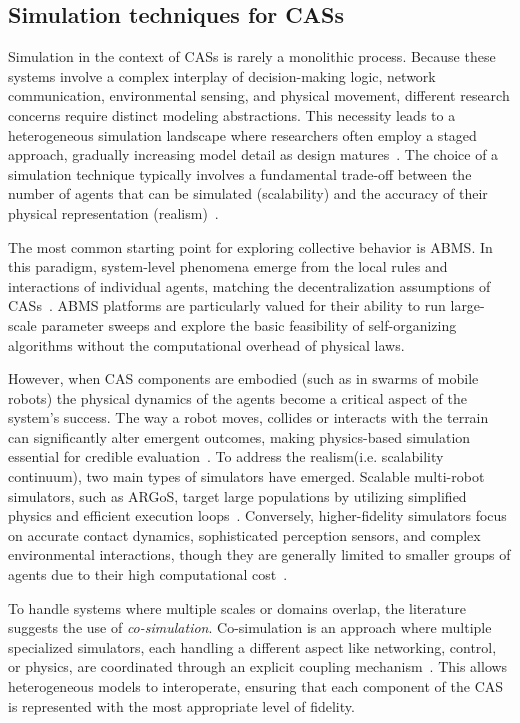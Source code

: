 \subsection{Simulation techniques for \aclp{CAS}}
Simulation in the context of \aclp{CAS} is rarely a monolithic process. Because these systems involve a complex interplay of decision-making logic, network communication, environmental sensing, and physical movement, different research concerns require distinct modeling abstractions. This necessity leads to a heterogeneous simulation landscape where researchers often employ a staged approach, gradually increasing model detail as design matures~\cite{DBLP:journals/csur/GomesTBLV18}. The choice of a simulation technique typically involves a fundamental trade-off between the number of agents that can be simulated (scalability) and the accuracy of their physical representation (realism)~\cite{DBLP:journals/isci/Schut10}.

The most common starting point for exploring collective behavior is \ac{ABMS}. In this paradigm, system-level phenomena emerge from the local rules and interactions of individual agents, matching the decentralization assumptions of \acp{CAS}~\cite{DBLP:journals/csr/AbarTLO17}. \ac{ABMS} platforms are particularly valued for their ability to run large-scale parameter sweeps and explore the basic feasibility of self-organizing algorithms without the computational overhead of physical laws.

However, when \ac{CAS} components are embodied (such as in swarms of mobile robots) the physical dynamics of the agents become a critical aspect of the system's success. The way a robot moves, collides or interacts with the terrain can significantly alter emergent outcomes, making physics-based simulation essential for credible evaluation~\cite{DBLP:journals/swarm/BrambillaFBD13}. To address the realism(i.e. scalability continuum), two main types of simulators have emerged. Scalable multi-robot simulators, such as \ac{ARGoS}, target large populations by utilizing simplified physics and efficient execution loops~\cite{DBLP:journals/swarm/PinciroliTOPBBMFCDBGD12}. Conversely, higher-fidelity simulators focus on accurate contact dynamics, sophisticated perception sensors, and complex environmental interactions, though they are generally limited to smaller groups of agents due to their high computational cost~\cite{DBLP:conf/iros/KoenigH04}.

To handle systems where multiple scales or domains overlap, the literature suggests the use of \emph{co-simulation}. Co-simulation is an approach where multiple specialized simulators, each handling a different aspect like networking, control, or physics, are coordinated through an explicit coupling mechanism~\cite{DBLP:journals/csur/GomesTBLV18}. This allows heterogeneous models to interoperate, ensuring that each component of the \ac{CAS} is represented with the most appropriate level of fidelity.


